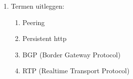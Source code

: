 \begin{enumerate}
\begin{enumerate}
\end{enumerate}

\item Termen uitleggen:

    \begin{enumerate}
         \item Peering

        \item Persistent http

        \item BGP (Border Gateway Protocol)

        \item RTP (Realtime Transport Protocol)

        \end{enumerate}
\end{enumerate}



